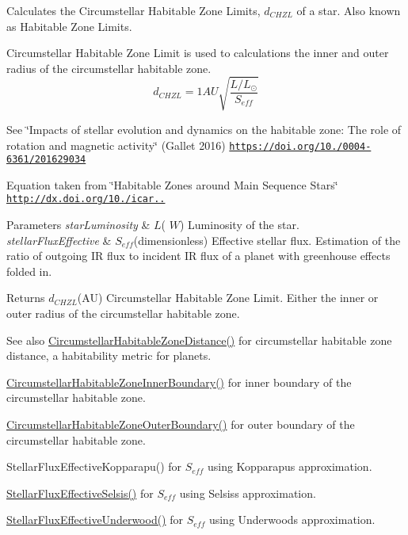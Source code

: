 Calculates the Circumstellar Habitable Zone Limits, $d_{CHZL}$ of a star. Also known as Habitable Zone Limits. 

Circumstellar Habitable Zone Limit is used to calculations the inner and outer radius of the circumstellar habitable zone. \[d_{CHZL}=1AU \sqrt{ \frac{L/L_\odot}{S_{eff}} }\]

See \char`\"{}\+Impacts of stellar evolution and dynamics on the habitable zone\+: The role of rotation and magnetic activity\char`\"{} (Gallet 2016) \href{https://doi.org/10.1051/0004-6361/201629034}{\tt https\+://doi.\+org/10./0004-\/6361/201629034}

Equation taken from \char`\"{}\+Habitable Zones around Main Sequence Stars\char`\"{} \href{http://dx.doi.org/10.1006/icar.1993.1010}{\tt http\+://dx.\+doi.\+org/10./icar..}


\begin{DoxyParams}{Parameters}
{\em star\+Luminosity} & $L$( $W$) Luminosity of the star. \\
\hline
{\em stellar\+Flux\+Effective} & $S_{eff}$(dimensionless) Effective stellar flux. Estimation of the ratio of outgoing IR flux to incident IR flux of a planet with greenhouse effects folded in. \\
\hline
\end{DoxyParams}
\begin{DoxyReturn}{Returns}
$d_{CHZL}$(AU) Circumstellar Habitable Zone Limit. Either the inner or outer radius of the circumstellar habitable zone. 
\end{DoxyReturn}
\begin{DoxySeeAlso}{See also}
\hyperlink{group___astrophysics_gacf3a720793cdb27f6d93b170b44e81be}{Circumstellar\+Habitable\+Zone\+Distance()} for circumstellar habitable zone distance, a habitability metric for planets. 

\hyperlink{group___astrophysics_ga9ee2e8023cb444aa4638c962788b5853}{Circumstellar\+Habitable\+Zone\+Inner\+Boundary()} for inner boundary of the circumstellar habitable zone. 

\hyperlink{group___astrophysics_gaa47fcde814ba8007de800e930fc0a08d}{Circumstellar\+Habitable\+Zone\+Outer\+Boundary()} for outer boundary of the circumstellar habitable zone. 

Stellar\+Flux\+Effective\+Kopparapu() for $S_{eff}$ using Kopparapu\textquotesingle{}s approximation. 

\hyperlink{group___astrophysics_ga3ce3a04fec7b1c8fb66ac54270ce3902}{Stellar\+Flux\+Effective\+Selsis()} for $S_{eff}$ using Selsis\textquotesingle{}s approximation. 

\hyperlink{group___astrophysics_ga34d1e39bce17904bc6d383f1935c79d6}{Stellar\+Flux\+Effective\+Underwood()} for $S_{eff}$ using Underwood\textquotesingle{}s approximation. 
\end{DoxySeeAlso}
\mbox{\label{group___astrophysics_gaa47fcde814ba8007de800e930fc0a08d}} 
